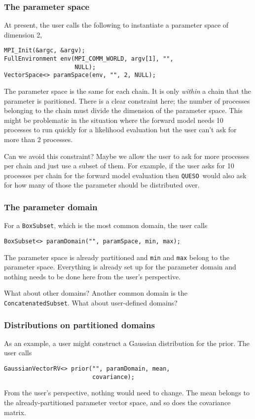 \documentclass{article}
\newcommand{\Queso}{\texttt{QUESO}}
\begin{document}
\subsubsection{The parameter space}

At present, the user calls the following to instantiate a parameter space of
dimension 2,
\begin{lstlisting}
MPI_Init(&argc, &argv);
FullEnvironment env(MPI_COMM_WORLD, argv[1], "",
                    NULL);
VectorSpace<> paramSpace(env, "", 2, NULL);
\end{lstlisting}
The parameter space is the same for each chain.  It is only \emph{within} a
chain that the parameter is paritioned.  There is a clear constraint here; the
number of processes belonging to the chain must divide the dimension of the
parameter space.  This might be problematic in the situation where the forward
model needs 10 processes to run quickly for a likelihood evaluation but the
user can't ask for more than 2 processes.

Can we avoid this constraint?  Maybe we allow the user to ask for more
processes per chain and just use a subset of them.  For example, if the user
asks for 10 processes per chain for the forward model evaluation then \Queso\
would also ask for how many of those the parameter should be distributed over.

\subsubsection{The parameter domain}

For a \lstinline|BoxSubset|, which is the most common domain, the user calls
\begin{lstlisting}
BoxSubset<> paramDomain("", paramSpace, min, max);
\end{lstlisting}
The parameter space is already partitioned and \lstinline|min| and
\lstinline|max| belong to the parameter space.  Everything is already set up
for the parameter domain and nothing needs to be done here from the user's
perspective.

What about other domains?  Another common domain is the
\lstinline|ConcatenatedSubset|.  What about user-defined domains?

\subsubsection{Distributions on partitioned domains}

As an example, a user might construct a Gaussian distribution for the prior.
The user calls
\begin{lstlisting}
GaussianVectorRV<> prior("", paramDomain, mean,
                         covariance);
\end{lstlisting}
From the user's perspective, nothing would need to change.  The mean belongs
to the already-partitioned parameter vector space, and so does the covariance
matrix.
\end{document}
